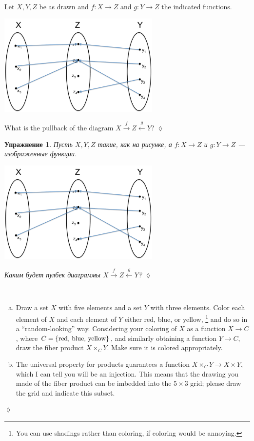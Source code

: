 \documentclass[a4paper]{book}
\def\tn{\textnormal}
\def\to{\rightarrow}
\def\taking{\colon}
\newcommand{\Too}[1]{\xrightarrow{\ \ #1\ \ }}
\newcommand{\Fromm}[1]{\xleftarrow{\ \ #1\ \ }}
\theoremstyle{myth}
\newtheorem{excENG}[envENG]{\begin{english}Exercise\end{english}}
\newenvironment{exerciseENG}{\begin{excENG}}{\hspace*{\fill}$\lozenge$\end{excENG}}
\newtheorem{excRUS}[envRUS]{Упражнение}
\newenvironment{exerciseRUS}{\begin{excRUS}}{\hspace*{\fill}$\lozenge$\end{excRUS}}
\def\sexc{\begin{enumerate}[a.)]\setlength{\itemsep}{.1cm}\setlength{\parskip}{.1cm}\item}
\def\next{\item}
\def\endsexc{\end{enumerate}}
\begin{document}
\begin{russian}
\begin{exerciseENG}
Let $X,Y,Z$ be as drawn and $f\taking X\to Z$ and $g\taking Y\to Z$ the indicated functions. 
\begin{center}
\includegraphics[height=2in]{setPullback}
\end{center}
What is the pullback of the diagram $X\Too{f}Z\Fromm{g}Y$?
\end{exerciseENG}

\begin{exerciseRUS}
Пусть $X,Y,Z$ такие, как на рисунке, а $f\taking X\to Z$ и $g\taking Y\to Z$ — изображенные функции. 
\begin{center}
\includegraphics[height=2in]{setPullback}
\end{center}
Каким будет пулбек диаграммы $X\Too{f}Z\Fromm{g}Y$?
\end{exerciseRUS}

\begin{exerciseENG}~
\sexc Draw a set $X$ with five elements and a set $Y$ with three elements. Color each element of $X$ and each element of $Y$ either red, blue, or yellow,%
\footnote{You can use shadings rather than coloring, if coloring would be annoying.}
and do so in a “random-looking” way. Considering your coloring of $X$ as a function $X\to C$, where $C=\{\tn{red, blue, yellow}\}$, and similarly obtaining a function $Y\to C$, draw the fiber product $X\times_CY$. Make sure it is colored appropriately.
\next The universal property for products guarantees a function $X\times_CY\to X\times Y$, which I can tell you will be an injection. This means that the drawing you made of the fiber product can be imbedded into the $5\times 3$ grid; please draw the grid and indicate this subset.
\endsexc
\end{exerciseENG}


\end{russian}
\end{document}
